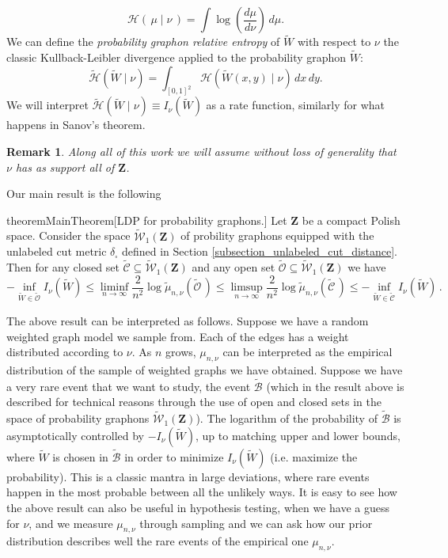 \documentclass[12pt,twoside,a4paper]{article}
\newtheorem{remark}[theorem]{Remark}
\newcommand{\Space}{\mathbf{Z}}
\newcommand{\UGraphon}{\widetilde{\mathcal{W}}_1}
\newcommand{\lep}{\left(}
\newcommand{\rip}{\right)}
\begin{document}
\[
\mathcal{H}(\,\mu\mid \nu\,) = 
\int \log \left(\frac{d\mu}{d\nu}\right) \, d\mu.
\]
We can define the \emph{probability graphon relative entropy} of $\widetilde{W}$ with respect to $\nu$ the classic Kullback-Leibler divergence applied to the probability graphon $\widetilde{W}:$
\[
\widetilde{\mathcal{H}}(\widetilde{W} \mid \nu) = \int_{[0,1]^2} \mathcal{H}(\widetilde{W}(x,y) \mid \nu) \, dx \, dy.
\]
We will interpret $\widetilde{\mathcal{H}}(\widetilde{W} \mid \nu)\equiv I_\nu\lep\widetilde{W}\rip$ as a rate function, similarly for what happens in Sanov's theorem. 
\begin{remark}
    Along all of this work we will assume without loss of generality that $\nu$ has as support all of $\Space$.
\end{remark} 
Our main result is the following

\begin{restatable}{theorem}{MainTheorem}[LDP for probability graphons.]\label{thm_mainresult}
    Let $\Space$ be a compact Polish space. Consider the space $\UGraphon(\Space)$ of probility graphons equipped with the unlabeled cut metric $\delta_\square$ defined in Section \ref{subsection_unlabeled_cut_distance}. Then for any closed set $\widetilde{\mathcal{C}} \subseteq \widetilde{\mathcal{W}}_1(\Space)$ and any open set $\widetilde{\mathcal{O}} \subseteq \widetilde{\mathcal{W}}_1(\Space)$ we have
\[
-\inf_{\widetilde{W} \in \widetilde{\mathcal{O}}} I_\nu(\widetilde{W})\leq\liminf_{n \to \infty} \frac{2}{n^2} \log \widetilde{\mu}_{n,\nu}(\widetilde{\mathcal{O}}\,)\leq\limsup_{n \to \infty} \frac{2}{n^2} \log \widetilde{\mu}_{n,\nu}(\widetilde{\mathcal{C}}\,) \leq -\inf_{\widetilde{W} \in \widetilde{\mathcal{C}}} I_\nu(\widetilde{W}) \,.
\]
\end{restatable}
The above result can be interpreted as follows. Suppose we have a random weighted graph model we sample from. Each of the edges has a weight distributed according to $\nu.$ As $n$ grows, $\mu_{n,\nu}$ can be interpreted as the empirical distribution of the sample of weighted graphs we have obtained. Suppose we have a very rare event that we want to study, the event $\widetilde{\mathcal{B}}$ (which in the result above is described for technical reasons through the use of open and closed sets in the space of probability graphons $\UGraphon(\Space)$). The logarithm of the probability of $\widetilde{\mathcal{B}}$ is asymptotically controlled by $-I_\nu(\widetilde{W})$, up to matching upper and lower bounds, where $\widetilde{W}$ is chosen in $\widetilde{\mathcal{B}}$ in order to minimize $I_\nu(\widetilde{W})$ (i.e. maximize the probability). This is a classic mantra in large deviations, where rare events happen in the most probable between all the unlikely ways. It is easy to see how the above result can also be useful in hypothesis testing, when we have a guess for $\nu$, and we measure $\mu_{n,\nu}$ through sampling and we can ask how our prior distribution describes well the rare events of the empirical one $\mu_{n,\nu}$.
\end{document}
